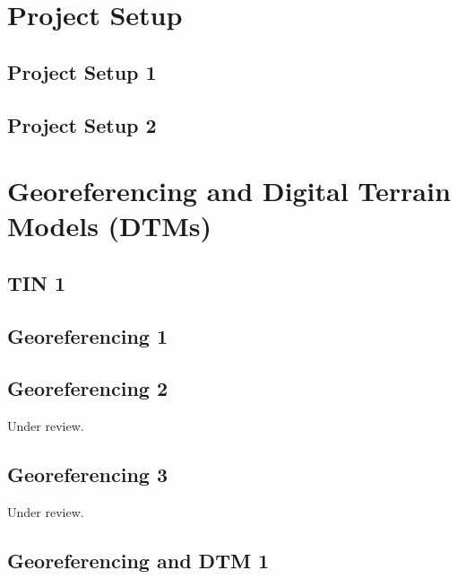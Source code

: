 \documentclass{scrartcl}
\begin{document}
\section{Project Setup}

\subsection{Project Setup 1}
\label{sec:project_setup_1}
\clearpage

\subsection{Project Setup 2}
\label{sec:project_setup_2}
\clearpage

\section{Georeferencing and Digital Terrain Models (DTMs)}

\subsection{TIN 1}
\label{sec:tin_1}
\clearpage

\subsection{Georeferencing 1}
\label{sec:georeferencing_1}
\clearpage

\subsection{Georeferencing 2} %
\label{sec:georeferencing_3}
Under review.%
\clearpage

\subsection{Georeferencing 3} %
\label{sec:georeferencing_4}
Under review.%
\clearpage

\subsection{Georeferencing and DTM 1}
\label{sec:georef_tin_1}
\clearpage
\end{document}
